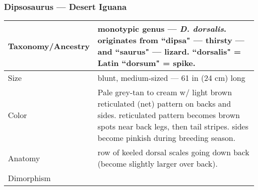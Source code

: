 \subsubsection{Dipsosaurus --- Desert Iguana}
\begin{center}
\begin{longtabu} to 

	\hline
	Taxonomy/Ancestry &
	monotypic genus --- \emph{D. dorsalis}. originates from ``dipsa" --- thirsty --- and ``saurus" --- lizard. ``dorsalis" = Latin ``dorsum" = spike.
	
	 \\
	\hline
	Size & 
	blunt, medium-sized --- 61 in (24 cm) long
	\\
	\hline
	Color &
	Pale grey-tan to cream w/ light brown reticulated (net) pattern on backs and sides. reticulated pattern becomes brown spots near back legs, then tail stripes. sides become pinkish during breeding season.
	 \\
	\hline
	Anatomy &
	row of keeled dorsal scales going down back (become slightly larger over back).
	 \\
	\hline
	Dimorphism & 
	

\end{longtabu}
\end{center}
